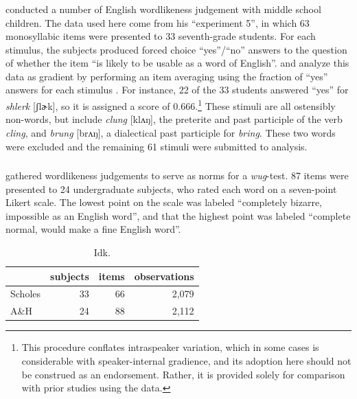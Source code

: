 \subsubsection{\citealt{Scholes1966}}

\citet{Scholes1966} conducted a number of English wordlikeness judgement with middle school children. The data used here come from his ``experiment 5'', in which 63 monosyllabic items were presented to 33 seventh-grade students. For each stimulus, the subjects produced forced choice ``yes''/``no'' answers to the question of whether the item ``is likely to be usable as a word of English''. \citet{Hayes2008a} and \citet{Albright2009a} analyze this data as gradient by performing an item averaging using the fraction of ``yes'' answers for each stimulus \citep[see also][]{Pierrehumbert1994,Coleman1997,Frisch2000}. For instance, 22 of the 33 students answered ``yes'' for \emph{shlerk} [ʃlɚk], so it is assigned a score of $0.666$.\footnote{This procedure conflates intraspeaker variation, which in some cases is considerable \citep{Shademan2007} with speaker-internal gradience, and its adoption here should not be construed as an endorsement. Rather, it is provided solely for comparison with prior studies using the \citeauthor{Scholes1966} data.} These stimuli are all ostensibly non-words, but include \emph{clung} [klʌŋ], the preterite and past participle of the verb \emph{cling}, and \emph{brung} [brʌŋ], a dialectical past participle for \emph{bring}. These two words were excluded and the remaining 61 stimuli were submitted to analysis. 

\subsubsection{\citealt{Albright2003b}}

\citet{Albright2003b} gathered wordlikeness judgements to serve as norms for a \emph{wug}-test. 87 items were presented to 24 undergraduate subjects, who rated each word on a seven-point Likert scale. The lowest point on the scale was labeled ``completely bizarre, impossible as an English word'', and that the highest point was labeled ``complete normal, would make a fine English word''.

\begin{table}
\label{counts}
\centering
\begin{tabular}{l r r r}
\toprule
        & subjects & items & observations \\
\midrule
Scholes & 33       & 66    & 2,079        \\
A\&H    & 24       & 88    & 2,112        \\
\bottomrule
\end{tabular}
\caption{Idk.}
\end{table}

